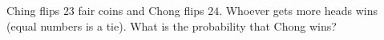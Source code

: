 Ching flips $23$ fair coins and Chong flips $24$. Whoever gets more heads wins (equal numbers is a tie). What is the probability that Chong wins?
